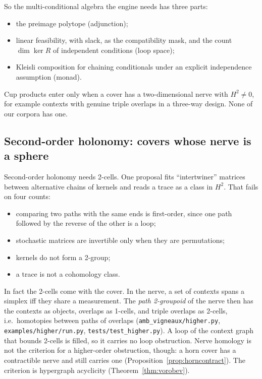 \documentclass[11pt]{article}
\theoremstyle{definition}
\theoremstyle{remark}
\begin{document}
\noindent So the multi-conditional algebra the engine needs has three parts:
\begin{itemize}
  \item the preimage polytope (adjunction);
  \item linear feasibility, with slack, as the compatibility mask, and the count $\dim\ker R$ of independent conditions (loop space);
  \item Kleisli composition for chaining conditionals under an explicit independence assumption (monad).
\end{itemize}
Cup products enter only when a cover has a two-dimensional nerve with $H^2\ne0$, for example contexts with genuine triple overlaps in a three-way design. None of our corpora has one.

\subsection{Second-order holonomy: covers whose nerve is a sphere}\label{sec:higher}
Second-order holonomy needs 2-cells. One proposal fits ``intertwiner'' matrices between alternative chains of kernels and reads a trace as a class in $H^2$. That fails on four counts:
\begin{itemize}
  \item comparing two paths with the same ends is first-order, since one path followed by the reverse of the other is a loop;
  \item stochastic matrices are invertible only when they are permutations;
  \item kernels do not form a 2-group;
  \item a trace is not a cohomology class.
\end{itemize}
In fact the 2-cells come with the cover. In the nerve, a set of contexts spans a simplex iff they share a measurement. The \emph{path 2-groupoid} of the nerve then has the contexts as objects, overlaps as 1-cells, and triple overlaps as 2-cells, i.e.\ homotopies between paths of overlaps (\texttt{amb\_vigneaux/higher.py}, \texttt{examples/higher/run.py}, \texttt{tests/test\_higher.py}). A loop of the context graph that bounds 2-cells is filled, so it carries no loop obstruction. Nerve homology is not the criterion for a higher-order obstruction, though: a horn cover has a contractible nerve and still carries one (Proposition~\ref{prop:horncontract}). The criterion is hypergraph acyclicity (Theorem~\ref{thm:vorobev}).
\end{document}
